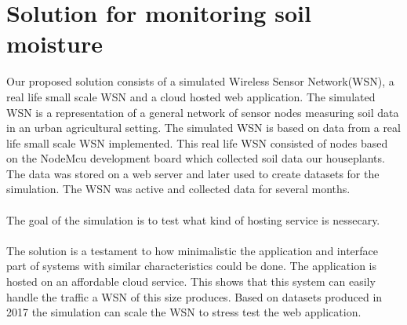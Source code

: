 \documentclass[]{uiophd}
\begin{document}
\chapter{Solution for monitoring soil moisture}
Our proposed solution consists of a simulated Wireless Sensor Network(WSN), a real life small scale WSN and a cloud hosted web application. The simulated WSN is a representation of a general network of sensor nodes measuring soil data in an urban agricultural setting. The simulated WSN is based on data from a real life small scale WSN implemented. This real life WSN consisted of nodes based on the NodeMcu development board which collected soil data our houseplants. The data was stored on a web server and later used to create datasets for the simulation. The WSN was active and collected data for several months. 
\\\\
The goal of the simulation is to test what kind of hosting service is nessecary.
\\\\
The solution is a testament to how minimalistic the application and interface part of systems with similar characteristics could be done. The application is hosted on an affordable cloud service. This shows that this system can easily handle the traffic a WSN of this size produces. Based on datasets produced in 2017 the simulation can scale the WSN to stress test the web application.
\end{document}
